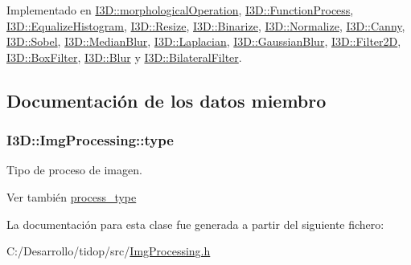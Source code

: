 Implementado en \hyperlink{class_i3_d_1_1morphological_operation_aafa533c5999bed3e9d4680a6434cb43e}{I3\+D\+::morphological\+Operation}, \hyperlink{class_i3_d_1_1_function_process_aa321eb93219271fa3f841538b61133c3}{I3\+D\+::\+Function\+Process}, \hyperlink{class_i3_d_1_1_equalize_histogram_ac748887f28d189287a120b5c6b0977a2}{I3\+D\+::\+Equalize\+Histogram}, \hyperlink{class_i3_d_1_1_resize_a683bd71d9e24c64416dc68231728a73e}{I3\+D\+::\+Resize}, \hyperlink{class_i3_d_1_1_binarize_a2630da33f5cc1c9fe80c991ffd84f613}{I3\+D\+::\+Binarize}, \hyperlink{class_i3_d_1_1_normalize_a14506e377bd5da73c37ce960c2fdf07e}{I3\+D\+::\+Normalize}, \hyperlink{class_i3_d_1_1_canny_a5337ec2dd0c95fe7c9d05444ed8f6425}{I3\+D\+::\+Canny}, \hyperlink{class_i3_d_1_1_sobel_a902c7392196e514597820fbe13a2a634}{I3\+D\+::\+Sobel}, \hyperlink{class_i3_d_1_1_median_blur_aae49eae3c8ceda4ba3a2c485d2a64b4d}{I3\+D\+::\+Median\+Blur}, \hyperlink{class_i3_d_1_1_laplacian_a7e14ea57d17b73a74058083a809fa5c3}{I3\+D\+::\+Laplacian}, \hyperlink{class_i3_d_1_1_gaussian_blur_a19812cea51167dd35e8a85d3178061d5}{I3\+D\+::\+Gaussian\+Blur}, \hyperlink{class_i3_d_1_1_filter2_d_a46f44465658be004e62d7e72cc40cb84}{I3\+D\+::\+Filter2D}, \hyperlink{class_i3_d_1_1_box_filter_aaea2d395620162626a7b16b85ae44c42}{I3\+D\+::\+Box\+Filter}, \hyperlink{class_i3_d_1_1_blur_a9bc99ea12ce16294f415f67ce467a81b}{I3\+D\+::\+Blur} y \hyperlink{class_i3_d_1_1_bilateral_filter_a4b606ce8517fbd44dd1734e1a54bab10}{I3\+D\+::\+Bilateral\+Filter}.



\subsection{Documentación de los datos miembro}
\subsubsection[{\texorpdfstring{type}{type}}]{ I3\+D\+::\+Img\+Processing\+::type}\hypertarget{class_i3_d_1_1_img_processing_af87bd3404d91bca669b04af1f45cbff0}{}\label{class_i3_d_1_1_img_processing_af87bd3404d91bca669b04af1f45cbff0}


Tipo de proceso de imagen. 

\begin{DoxySeeAlso}{Ver también}
\hyperlink{group___img_proc_gaa7be5aaaa0e9ec5885c5bd72f41dad47}{process\+\_\+type} 
\end{DoxySeeAlso}


La documentación para esta clase fue generada a partir del siguiente fichero\+:\begin{DoxyCompactItemize}
\item 
C\+:/\+Desarrollo/tidop/src/\hyperlink{_img_processing_8h}{Img\+Processing.\+h}\end{DoxyCompactItemize}
